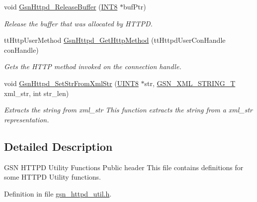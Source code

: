 \begin{DoxyCompactItemize}
void \hyperlink{a00666_ga98b1c525385ddbcbaac8ec8ba4d32ea4}{GsnHttpd\_\-ReleaseBuffer} (\hyperlink{a00660_ga307b8734c020247f6bac4fcde0dcfbb9}{INT8} $\ast$bufPtr)
\begin{DoxyCompactList}\small\item\em Release the buffer that was allocated by HTTPD. \end{DoxyCompactList}\item 
ttHttpUserMethod \hyperlink{a00666_gaecd42418ea97610f5b55c35c5419cd13}{GsnHttpd\_\-GetHttpMethod} (ttHttpdUserConHandle conHandle)
\begin{DoxyCompactList}\small\item\em Gets the HTTP method invoked on the connection handle. \end{DoxyCompactList}\item 
void \hyperlink{a00666_ga1d8828de7be384020ba6bbb1ea26a47c}{GsnHttpd\_\-SetStrFromXmlStr} (\hyperlink{a00660_gab27e9918b538ce9d8ca692479b375b6a}{UINT8} $\ast$str, \hyperlink{a00436}{GSN\_\-XML\_\-STRING\_\-T} xml\_\-str, int str\_\-len)
\begin{DoxyCompactList}\small\item\em Extracts the string from xml\_\-str This function extracts the string from a xml\_\-str representation. \end{DoxyCompactList}\end{DoxyCompactItemize}


\subsection{Detailed Description}
GSN HTTPD Utility Functions Public header This file contains definitions for some HTTPD Utility functions. 

Definition in file \hyperlink{a00514_source}{gsn\_\-httpd\_\-util.h}.

